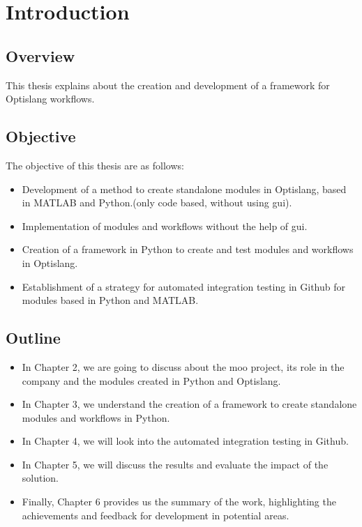 \chapter{Introduction}
\section{Overview}
This thesis explains about the creation and development of a framework for Optislang workflows.


\section{Objective}
The objective of this thesis are as follows:
\begin{itemize}
    \item Development of a method to create standalone modules in Optislang, based in MATLAB and Python.(only code based, without using 
    \acrshort{gui}).
    \item Implementation of modules and workflows without the help of \acrshort{gui}.
    \item Creation of a framework in Python to create and test modules and workflows in Optislang.
    \item Establishment of a strategy for automated integration testing in Github for modules based in Python and MATLAB. 
\end{itemize}

\section{Outline}
\begin{itemize}
    \item   In Chapter 2, we are going to discuss about the \acrshort{moo} project, its role in the company and the modules created in Python and Optislang.
    \item   In Chapter 3, we understand the creation of a framework to create standalone modules and workflows in Python.
    \item   In Chapter 4, we will look into the automated integration testing in Github.
    \item   In Chapter 5, we will discuss the results and evaluate the impact of the solution.
    \item   Finally, Chapter 6 provides us the summary of the work, highlighting the achievements and feedback for development in potential areas.
\end{itemize}